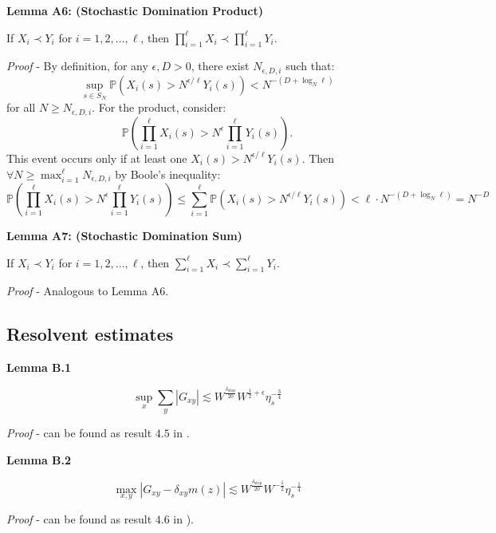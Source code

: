 \documentclass[11pt]{article}
\newenvironment{boxtheorem}[1]
  {\begin{mdframed}\noindent\textbf{#1}\itshape\space}
  {\end{mdframed}}
\newcommand{\sto}{\text{stop}}
\begin{document}
\begin{boxtheorem}{Lemma A6: (Stochastic Domination Product)}\label{lemma-a6}

If $X_i \prec Y_i$ for $i = 1,2,...,\ell$, then $\prod_{i=1}^{\ell} X_i \prec \prod_{i=1}^{\ell} Y_i$.
\end{boxtheorem}
\textit{Proof} - By definition, for any $\epsilon, D > 0$, there exist $N_{\epsilon,D,i}$ such that: $$\sup_{s\in S_N}\mathbb{P}\left(X_i(s) > N^{\epsilon/\ell} Y_i(s)\right) < N^{-(D+\log_N \ell)}$$ for all $N \geq N_{\epsilon,D,i}$. For the product, consider: $$\mathbb{P}\left(\prod_{i=1}^{\ell} X_i(s) > N^{\epsilon} \prod_{i=1}^{\ell} Y_i(s)\right).$$
This event occurs only if at least one $X_i(s) > N^{\epsilon/\ell} Y_i(s)$. Then $\forall N \geq \max_{i=1}^{\ell} N_{\epsilon,D,i}$ by Boole's inequality: $$\mathbb{P}\left(\prod_{i=1}^{\ell} X_i(s) > N^{\epsilon} \prod_{i=1}^{\ell} Y_i(s)\right) \leq \sum_{i=1}^{\ell} \mathbb{P}\left(X_i(s) > N^{\epsilon/\ell} Y_i(s)\right) < \ell \cdot N^{-(D+\log_N \ell)} = N^{-D}$$ 
\begin{boxtheorem}{Lemma A7: (Stochastic Domination Sum)}\label{lemma-a7}

If $X_i \prec Y_i$ for $i = 1,2,...,\ell$, then $\sum_{i=1}^{\ell} X_i \prec \sum_{i=1}^{\ell} Y_i$.
\end{boxtheorem}
\textit{Proof} - Analogous to Lemma A6. 
\subsection*{Resolvent estimates}


\begin{boxtheorem}{Lemma B.1} \label{lemma-b1}


$$\sup_x \sum_y |G_{xy}|\lesssim W^{\frac{\delta_\sto}{20}}W^{\frac{1}{2}+\epsilon} \eta_s^{-\frac{3}{4}}$$
\end{boxtheorem}
\textit{Proof} - can be found as result $4.5$ in \cite{bandSDE}.

\begin{boxtheorem}{Lemma B.2} \label{lemma-b2}

$$\max_{x, y} |G_{xy} - \delta_{xy}m(z)|\lesssim W^{\frac{\delta_\sto}{20}}W^{-\frac{1}{2}} \eta_s^{-\frac{1}{4}}
$$
\end{boxtheorem}
\textit{Proof} - can be found as result $4.6$ in \cite{bandSDE}). 
\end{document}
